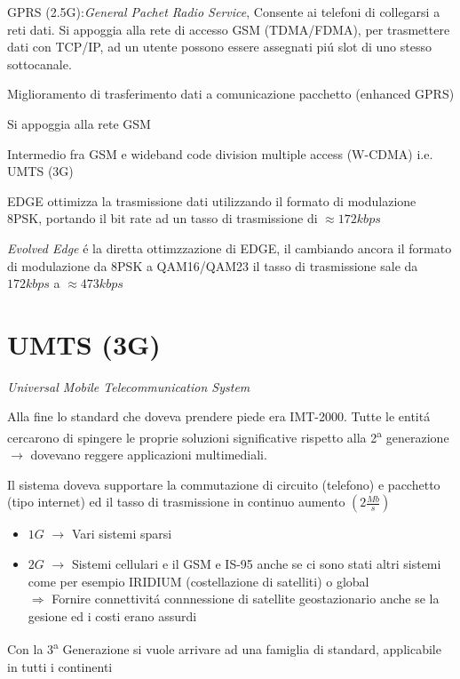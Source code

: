 \documentclass{article}
\begin{document}
GPRS (2.5G):\@\textit{General Pachet Radio Service}, Consente ai telefoni di collegarsi a reti dati. Si appoggia alla rete di accesso GSM (TDMA/FDMA), per trasmettere dati con TCP/IP, ad un utente possono essere assegnati pi\'u slot di uno stesso sottocanale.

Miglioramento di trasferimento dati a comunicazione pacchetto (enhanced GPRS)

Si appoggia alla rete GSM

Intermedio fra GSM e wideband code division multiple access (W-CDMA) i.e. UMTS (3G)

EDGE ottimizza la trasmissione dati utilizzando il formato di modulazione 8PSK, portando il bit rate ad un tasso di trasmissione di $\approx 172 kbps$

\textit{Evolved Edge} \'e la diretta ottimzzazione di EDGE, il cambiando ancora il formato di modulazione da 8PSK a QAM16/QAM23 il tasso di trasmissione sale da $172 kbps$ a $\approx473kbps$

\newpage


\newpage
\section{UMTS (3G)}
\textit{Universal Mobile Telecommunication System}

Alla fine lo standard che doveva prendere piede era IMT-2000. Tutte le entit\'a cercarono di spingere le proprie soluzioni significative rispetto alla 2\textsuperscript{a} generazione $\rightarrow$ dovevano reggere applicazioni multimediali.

Il sistema doveva supportare la commutazione di circuito (telefono) e pacchetto (tipo internet) ed il tasso di trasmissione in continuo aumento $\left(2\frac{Mb}{s}\right)$

\begin{itemize}
    \item $1G$ $\rightarrow$ Vari sistemi sparsi
    \item $2G$ $\rightarrow$ Sistemi cellulari e il GSM e IS-95 anche se ci sono stati altri sistemi come per esempio IRIDIUM (costellazione di satelliti) o global\\
        $\Rightarrow$ Fornire connettivit\'a connnessione di satellite geostazionario anche se la gesione ed i costi erano assurdi
\end{itemize}

Con la 3\textsuperscript{a} Generazione si vuole arrivare ad una famiglia di standard, applicabile in tutti i continenti
\end{document}
